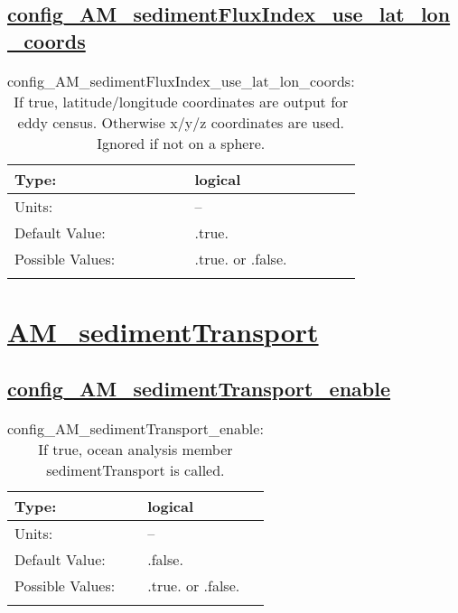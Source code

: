 \subsection[config\_AM\_sedimentFluxIndex\_use\_lat\_lon\_coords]{\hyperref[sec:nm_tab_AM_sedimentFluxIndex]{config\_AM\_sedimentFluxIndex\_use\_lat\_lon\_coords}}
\label{subsec:nm_sec_config_AM_sedimentFluxIndex_use_lat_lon_coords}
\begin{center}
\begin{longtable}{| p{2.0in} || p{4.0in} |}
    \hline
    Type: & logical \\
    \hline
    Units: & -- \\
    \hline
    Default Value: & .true. \\
    \hline
    Possible Values: & .true. or .false. \\
    \hline
    \caption{config\_AM\_sedimentFluxIndex\_use\_lat\_lon\_coords: If true, latitude/longitude coordinates are output for eddy census. Otherwise x/y/z coordinates are used. Ignored if not on a sphere.}
\end{longtable}
\end{center}
\section[AM\_sedimentTransport]{\hyperref[sec:nm_tab_AM_sedimentTransport]{AM\_sedimentTransport}}
\label{sec:nm_sec_AM_sedimentTransport}
\subsection[config\_AM\_sedimentTransport\_enable]{\hyperref[sec:nm_tab_AM_sedimentTransport]{config\_AM\_sedimentTransport\_enable}}
\label{subsec:nm_sec_config_AM_sedimentTransport_enable}
\begin{center}
\begin{longtable}{| p{2.0in} || p{4.0in} |}
    \hline
    Type: & logical \\
    \hline
    Units: & -- \\
    \hline
    Default Value: & .false. \\
    \hline
    Possible Values: & .true. or .false. \\
    \hline
    \caption{config\_AM\_sedimentTransport\_enable: If true, ocean analysis member sedimentTransport is called.}
\end{longtable}
\end{center}
